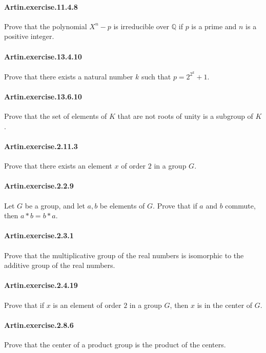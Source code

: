\documentclass{article}
\begin{document}
\paragraph{Artin.exercise.11.4.8} Prove that the polynomial $X^n-p$ is irreducible over $\mathbb{Q}$ if $p$ is a prime and $n$ is a positive integer.

\paragraph{Artin.exercise.13.4.10} Prove that there exists a natural number $k$ such that $p = 2^{2^k} + 1$.

\paragraph{Artin.exercise.13.6.10} Prove that the set of elements of $K$ that are not roots of unity is a subgroup of $K$.

\paragraph{Artin.exercise.2.11.3} Prove that there exists an element $x$ of order $2$ in a group $G$.

\paragraph{Artin.exercise.2.2.9} Let $G$ be a group, and let $a, b$ be elements of $G$. Prove that if $a$ and $b$ commute, then $a*b = b*a$.

\paragraph{Artin.exercise.2.3.1} Prove that the multiplicative group of the real numbers is isomorphic to the additive group of the real numbers.

\paragraph{Artin.exercise.2.4.19} Prove that if $x$ is an element of order $2$ in a group $G$, then $x$ is in the center of $G$.

\paragraph{Artin.exercise.2.8.6} Prove that the center of a product group is the product of the centers.
\end{document}

